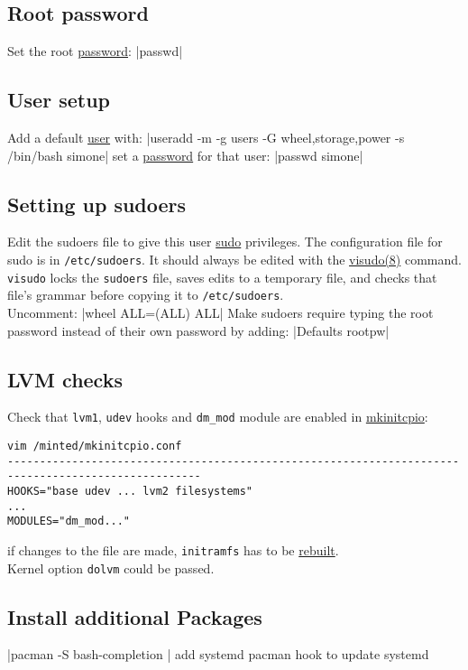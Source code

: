 \documentclass[11pt,A4]{article}
\newcommand{\linecode}[1]{ \mint[fontsize=\small,bgcolor=ArchCode,frame=single]{bash}|#1|}
\begin{document}
\subsection{Root password} 
Set the root \href{https://wiki.archlinux.org/index.php/Password}{password}:
\linecode{passwd}

\vspace{-7mm}
\subsection{User setup} 
Add a default \href{https://wiki.archlinux.org/index.php/Users_and_groups}{user} with:
\linecode{useradd -m -g users -G wheel,storage,power -s /bin/bash simone}
set a \href{https://wiki.archlinux.org/index.php/Password}{password} for that user:
\linecode{passwd simone} 

\vspace{-7mm}
\subsection{Setting up sudoers}
Edit the sudoers file to give this user \href{https://wiki.archlinux.org/index.php/Sudo#Configuration}{sudo} privileges. 
The configuration file for sudo is in \texttt{/etc/sudoers}. It should always be edited with the \href{https://jlk.fjfi.cvut.cz/arch/manpages/man/visudo.8}{visudo(8)} command. \texttt{visudo} locks the \texttt{sudoers} file, saves edits to a temporary file, and checks that file's grammar before copying it to \texttt{/etc/sudoers}.\\
Uncomment:
\linecode{wheel ALL=(ALL) ALL}
\noindent Make sudoers require typing the root password instead of their own password by adding:
\linecode{Defaults rootpw}

\subsection{LVM checks}
Check that \texttt{lvm1}, \texttt{udev} hooks and \texttt{dm\_mod} module are enabled in \href{https://wiki.archlinux.org/index.php/Mkinitcpio}{mkinitcpio}:

\begin{verbatim}
vim /minted/mkinitcpio.conf
----------------------------------------------------------------------------------------------------
HOOKS="base udev ... lvm2 filesystems"
...
MODULES="dm_mod..."
\end{verbatim}
if changes to the file are made, \texttt{initramfs} has to be \href{https://wiki.archlinux.org/index.php/Mkinitcpio#Installation}{rebuilt}.\\
Kernel option \texttt{dolvm} could be passed.
\subsection{Install additional Packages}
\linecode{pacman -S bash-completion }
add systemd pacman hook to update systemd
\end{document}

